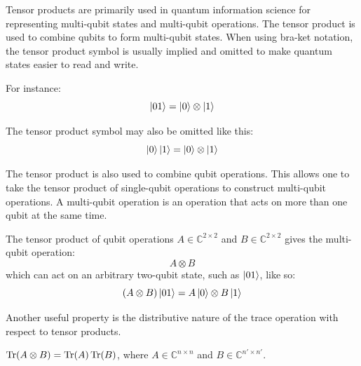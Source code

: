 Tensor products are primarily used in quantum information science for representing multi-qubit states and multi-qubit operations. The tensor product is used to combine qubits to form multi-qubit states. When using bra-ket notation, the tensor product symbol is usually implied and omitted to make quantum states easier to read and write.
\begin{example}
For instance:
$$\Ket{01} = \Ket{0} \otimes \Ket{1}$$
\end{example}
\begin{example}
The tensor product symbol may also be omitted like this:
$$\Ket{0}\Ket{1} = \Ket{0} \otimes \Ket{1}$$
\end{example}
The tensor product is also used to combine qubit operations. This allows one to take the tensor product of single-qubit operations to construct multi-qubit operations. A multi-qubit operation is an operation that acts on more than one qubit at the same time.
\begin{example}
The tensor product of qubit operations $A \in \mathbb{C}^{2 \times 2}$ and $B \in \mathbb{C}^{2 \times 2}$ gives the multi-qubit operation:
$$A \otimes B$$
which can act on an arbitrary two-qubit state, such as $\Ket{01}$, like so:
$$(A \otimes B)\Ket{01} = A\Ket{0} \otimes B\Ket{1}$$
\end{example}
Another useful property is the distributive nature of the trace operation with respect to tensor products. 
\begin{theorem}
\label{theorem:traceTensorDistribute}
$\operatorname{Tr}(A \otimes B) = \operatorname{Tr}(A)\operatorname{Tr}(B)$, where $A \in \mathbb{C}^{n \times n}$ and $B \in \mathbb{C}^{n' \times n'}$.
\end{theorem}
